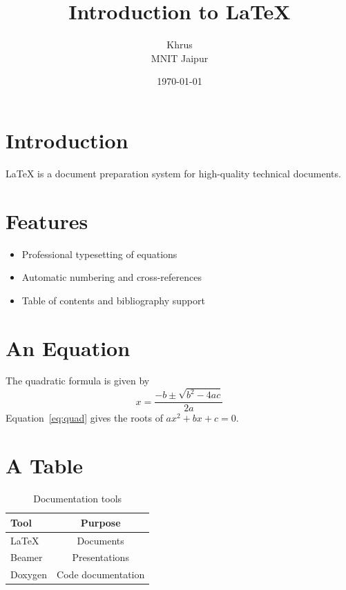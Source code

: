 \documentclass[12pt]{article}
\title{Introduction to \LaTeX}
\author{Khrus \\ MNIT Jaipur}
\date{\today}
\begin{document}
\maketitle

\section{Introduction}
\LaTeX{} is a document preparation system for high-quality technical documents.

\section{Features}
\begin{itemize}
  \item Professional typesetting of equations
  \item Automatic numbering and cross-references
  \item Table of contents and bibliography support
\end{itemize}

\section{An Equation}
The quadratic formula is given by
\begin{equation}
  x = \frac{-b \pm \sqrt{b^2 - 4ac}}{2a}
  \label{eq:quad}
\end{equation}
Equation~\ref{eq:quad} gives the roots of $ax^2 + bx + c = 0$.

\section{A Table}
\begin{table}[h]
\centering
\begin{tabular}{|l|c|}
\hline
\textbf{Tool} & \textbf{Purpose} \\
\hline
LaTeX & Documents \\
Beamer & Presentations \\
Doxygen & Code documentation \\
\hline
\end{tabular}
\caption{Documentation tools}
\end{table}
\end{document}

